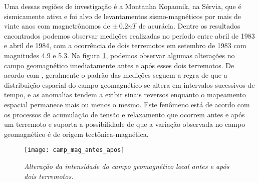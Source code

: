 Uma dessas regi\~oes de investiga\c{c}\~ao \'e a Montanha Kopaonik, na S\'ervia, que \'e sismicamente ativa e foi alvo de levantamentos sismo-magn\'eticos por mais de vinte anos com magnetr\^onomos de $\pm\,0.2 nT$ de acur\'acia. Dentre os resultados encontrados podemos observar medi\c{c}\~oes realizadas no per\'iodo entre abril de 1983 e abril de 1984, com a ocorr\^encia de dois terremotos em setembro de 1983 com magnitudes 4.9 e 5.3. Na figura \ref{fig.camp_mag_ant_apo}, podemos observar algumas altera\c{c}\~oes no campo geomagn\'etico imediatamente antes e ap\'os esses dois terremotos. De acordo com \cite{Rikitake_80}, geralmente o padr\~ao das medi\c{c}\~oes seguem a regra de que a distribui\c{c}\~ao espacial do campo geomagn\'etico se altera em intervalos sucessivos de tempo, e as anomalias tendem a exibir sinais reversos enquanto o mapeamento espacial permanece mais ou menos o mesmo. Este fen\^omeno est\'a de acordo com os processos de acumula\c{c}\~ao de tens\~ao e relaxamento que ocorrem antes e ap\'os um terremoto e suporta a possibilidade de que a varia\c{c}\~ao observada no campo geomagn\'etico \'e de origem tect\^onica-magn\'etica.
\begin{figure}
\centering
\texttt{[image: camp\_mag\_antes\_apos]}
\caption{\textit{Altera\c{c}\~ao da intensidade do campo geomagn\'etico local antes e ap\'os dois terremotos.}}
\label{fig.camp_mag_ant_apo}
\end{figure}











